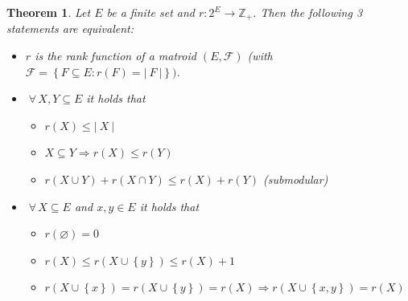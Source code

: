 \documentclass{article}
\newtheorem{theorem}{Theorem}
\newcommand{\card}[1]{\left|\:\!#1\:\!\right|}
\newcommand{\set}[1]{\left\{#1\right\}}
\newcommand{\fall}{\;\forall\,}
\begin{document}
\begin{theorem}
  \label{satz-8.6}
  Let $E$ be a finite set and $r: 2^E \rightarrow \mathbb{Z}_+$. Then the following 3 statements are equivalent:
  \begin{itemize}
    \item $r$ is the rank function of a matroid $(E, \mathcal{F})$ (with $\mathcal{F} = \set{F \subseteq E: r(F) = \card{F}})$.
    \item $\fall X, Y \subseteq E$ it holds that
      \begin{itemize}
        \item[(R1)] $r(X) \leq \card{X}$
        \item[(R2)] $X \subseteq Y \Rightarrow r(X) \leq r(Y)$
        \item[(R3)] $r(X \cup Y) + r(X \cap Y) \leq r(X) + r(Y)$ (submodular)
      \end{itemize}
    \item $\fall X \subseteq E$ and $x, y \in E$ it holds that
      \begin{itemize}
        \item[(R1')] $r(\diameter) = 0$
        \item[(R2')] $r(X) \leq r(X \cup \set{y}) \leq r(X) + 1$
        \item[(R3')] $r(X \cup \set{x}) = r(X \cup \set{y}) = r(X) \Rightarrow r(X \cup \set{x, y}) = r(X)$
      \end{itemize}
  \end{itemize}
\end{theorem}
\end{document}
